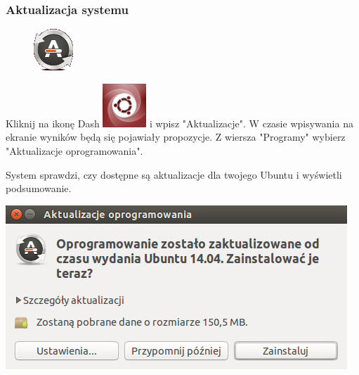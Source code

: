 \subsubsection{Aktualizacja systemu}
\begin{figure}
	\includegraphics[width=\linewidth]{images/pierwsze_uruchomienie_aktualizacja1.png}
\end{figure}

Kliknij na ikonę Dash \includegraphics[scale=0.35]{images/ikony_dash.png} i wpisz "Aktualizacje". W czasie wpisywania na ekranie wyników będą się pojawiały propozycje. Z wiersza "Programy" wybierz "Aktualizacje oprogramowania".

System sprawdzi, czy dostępne są aktualizacje dla twojego Ubuntu i wyświetli podsumowanie.

\begin{center}
	\includegraphics{images/pierwsze_uruchomienie_aktualizacja2.png}
\end{center}

